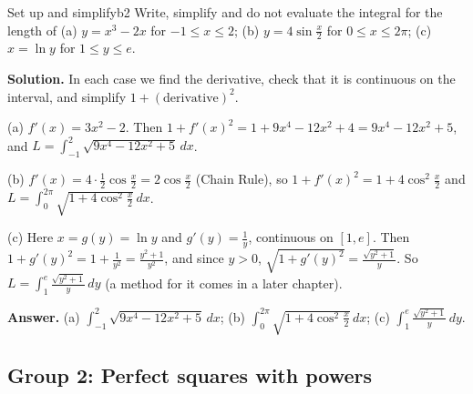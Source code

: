 \documentclass[11pt]{article}
\begin{document}
\begin{exmp}{Set up and simplify}{b2}
Write, simplify and do not evaluate the integral for the length of (a) $y=x^3-2x$ for $-1\le x\le2$; (b) $y=4\sin\frac x2$ for $0\le x\le2\pi$; (c) $x=\ln y$ for $1\le y\le e$.

\textbf{Solution.} In each case we find the derivative, check that it is continuous on the interval, and simplify $1+(\text{derivative})^2$.

(a) $f'(x)=3x^2-2$. Then $1+f'(x)^2=1+9x^4-12x^2+4=9x^4-12x^2+5$, and $L=\int_{-1}^2\sqrt{9x^4-12x^2+5}\,dx$.

(b) $f'(x)=4\cdot\frac12\cos\frac x2=2\cos\frac x2$ (Chain Rule), so $1+f'(x)^2=1+4\cos^2\frac x2$ and $L=\int_0^{2\pi}\sqrt{1+4\cos^2\frac x2}\,dx$.

(c) Here $x=g(y)=\ln y$ and $g'(y)=\frac1y$, continuous on $[1,e]$. Then $1+g'(y)^2=1+\frac1{y^2}=\frac{y^2+1}{y^2}$, and since $y>0$, $\sqrt{1+g'(y)^2}=\frac{\sqrt{y^2+1}}y$. So $L=\int_1^e\frac{\sqrt{y^2+1}}y\,dy$ (a method for it comes in a later chapter).

\textbf{Answer.} (a) $\int_{-1}^2\sqrt{9x^4-12x^2+5}\,dx$; (b) $\int_0^{2\pi}\sqrt{1+4\cos^2\frac x2}\,dx$; (c) $\int_1^e\frac{\sqrt{y^2+1}}y\,dy$.
\end{exmp}

\subsection*{Group 2: Perfect squares with powers}
\end{document}
